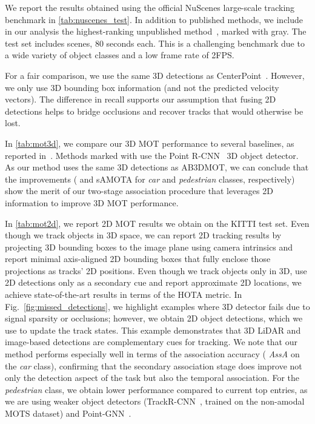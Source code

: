 \documentclass[letterpaper, 10 pt, conference]{ieeeconf}
\newcommand{\PAR}[1]{\vskip4pt \noindent {\bf #1~}}
\newcommand{\UNPUB}[1]{\textcolor{ubpubColor}{#1}}
\begin{document}
\PAR{NuScenes.} 
We report the results obtained using the official NuScenes large-scale tracking benchmark in \autoref{tab:nuscenes_test}. 
In addition to published methods, we include in our analysis the highest-ranking unpublished method~\cite{yin2020center}, marked with \UNPUB{gray}. 
The test set includes  scenes, 80 seconds each. This is a challenging benchmark due to a wide variety of object classes and a low frame rate of 2FPS.


For a fair comparison, we use the same 3D detections as CenterPoint~\cite{yin2020center}. However, we only use 3D bounding box information (and not the predicted velocity vectors). 
The difference in recall supports our assumption that fusing 2D detections helps to bridge occlusions and recover tracks that would otherwise be lost. 


\PAR{KITTI 3D MOT.} \label{part:kitti-results}
In \autoref{tab:mot3d}, we compare our 3D MOT performance to several baselines, as reported in~\cite{weng20cvpr}. Methods marked with  use the Point R-CNN~\cite{Shi19CVPR} 3D object detector. As our method uses the same 3D detections as AB3DMOT, we can conclude that the improvements ( and  sAMOTA for \textit{car} and \textit{pedestrian} classes, respectively) show the merit of our two-stage association procedure that leverages 2D information to improve 3D MOT performance.


\PAR{KITTI 2D MOT.}
In \autoref{tab:mot2d}, we report 2D MOT results we obtain on the KITTI test set.
Even though we track objects in 3D space, we can report 2D tracking results by projecting 3D bounding boxes to the image plane using camera intrinsics and report minimal axis-aligned 2D bounding boxes that fully enclose those projections as tracks' 2D positions.
Even though we track objects only in 3D, use 2D detections only as a secondary cue and report approximate 2D locations, we achieve state-of-the-art results in terms of the HOTA metric. 
In Fig.~\ref{fig:missed_detections}, we highlight examples where 3D detector fails due to signal sparsity or occlusions; however, we obtain 2D object detections, which we use to update the track states. This example demonstrates that 3D LiDAR and image-based detections are complementary cues for tracking. 
We note that our method performs especially well in terms of the association accuracy ( \textit{AssA} on the \textit{car} class), confirming that the secondary association stage does improve not only the detection aspect of the task but also the temporal association.
For the \textit{pedestrian} class, we obtain lower performance compared to current top entries, as we are using weaker object detectors (TrackR-CNN~\cite{Voigtlaender19CVPR}, trained on the non-amodal MOTS dataset) and Point-GNN~\cite{Point-GNN}. 
\end{document}
